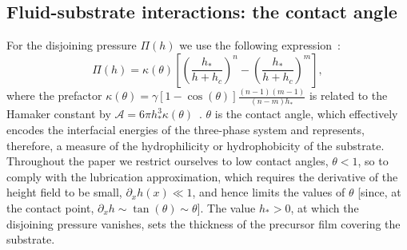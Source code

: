 \subsection{Fluid-substrate interactions: the contact angle}\label{subsec:fluid_substrate}
For the disjoining pressure $\Pi(h)$ we use the following expression~\cite{crasterDynamicsStabilityThin2009, peschkaSignaturesSlipDewetting2019, nesicFullyNonlinearDynamics2015, oronLongscaleEvolutionThin1997}:
\begin{equation}\label{eq:disjoin_p}
    \Pi(h) = \kappa(\theta) \left[\left(\frac{h_{\ast}}{h+h_c}\right)^n - \left(\frac{h_{\ast}}{h+h_c}\right)^m\right],
\end{equation}
where the prefactor $\kappa(\theta) = \gamma[1-\cos(\theta)]\frac{(n-1)(m-1)}{(n-m)h_{\ast}}$ is related to the Hamaker constant by $\mathcal{A} = 6 \pi h_{\ast}^3 \kappa(\theta)$~\cite{diezMetallicthinfilmInstabilitySpatially2016}.
$\theta$ is the contact angle, which effectively encodes the interfacial energies of the three-phase system and represents, therefore, a measure of the hydrophilicity or hydrophobicity of the substrate.
Throughout the paper we restrict ourselves to low contact angles, $\theta < 1$, so to comply with the lubrication approximation, which requires the derivative of the height field to be small, $\partial_x h(x) \ll 1$, and hence limits the values of $\theta$ [since, at the contact point, $\partial_x h \sim \tan(\theta) \sim \theta$].
The value $h_{\ast} > 0$, at which the disjoining pressure vanishes, sets the thickness of the precursor film covering the substrate.

